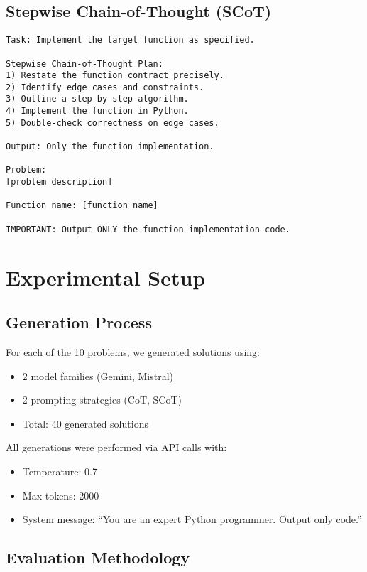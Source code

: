 \documentclass[11pt]{article}
\begin{document}
\subsection{Stepwise Chain-of-Thought (SCoT)}

\begin{lstlisting}[caption={SCoT Prompt Template}]
Task: Implement the target function as specified.

Stepwise Chain-of-Thought Plan:
1) Restate the function contract precisely.
2) Identify edge cases and constraints.
3) Outline a step-by-step algorithm.
4) Implement the function in Python.
5) Double-check correctness on edge cases.

Output: Only the function implementation.

Problem:
[problem description]

Function name: [function_name]

IMPORTANT: Output ONLY the function implementation code.
\end{lstlisting}

\section{Experimental Setup}

\subsection{Generation Process}

For each of the 10 problems, we generated solutions using:
\begin{itemize}
    \item 2 model families (Gemini, Mistral)
    \item 2 prompting strategies (CoT, SCoT)
    \item Total: 40 generated solutions
\end{itemize}

All generations were performed via API calls with:
\begin{itemize}
    \item Temperature: 0.7
    \item Max tokens: 2000
    \item System message: ``You are an expert Python programmer. Output only code.''
\end{itemize}

\subsection{Evaluation Methodology}
\end{document}

